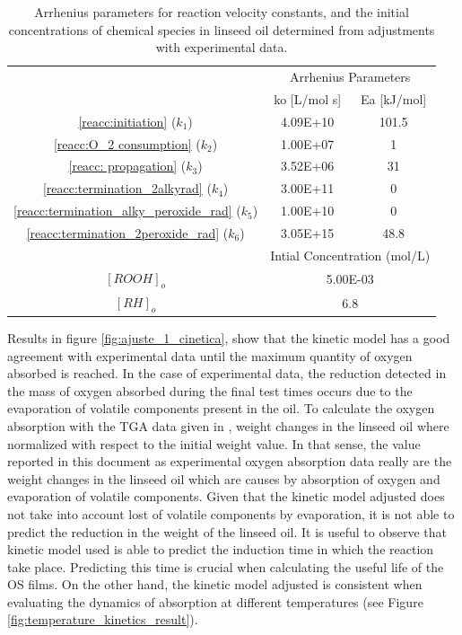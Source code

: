 \begin{table}[H]
\centering
\caption{Arrhenius parameters for reaction velocity constants, and the initial concentrations of chemical species in linseed oil determined from adjustments with experimental data. }
\label{tab:kinetic parameters}

\begin{tabular}{ccc}
\hline
\multirow{2}{*}{} & \multicolumn{2}{c}{Arrhenius   Parameters}  \\
                  & ko {[}L/mol s{]}         & Ea {[}kJ/mol{]}   \\ \hline
\ref{reacc:initiation} ($k_1$)  & 4.09E+10   & 101.5             \\ 
\ref{reacc:O_2 consumption} ($k_2$) & 1.00E+07 & 1               \\ 
\ref{reacc: propagation} ($k_3$) & 3.52E+06  & 31                 \\ 
\ref{reacc:termination_2alkyrad} ($k_4$)  & 3.00E+11 & 0          \\ 
\ref{reacc:termination_alky_peroxide_rad} ($k_5$) & 1.00E+10 & 0   \\
\ref{reacc:termination_2peroxide_rad} ($k_6$)  & 3.05E+15 & 48.8    \\ \hline
                  & \multicolumn{2}{c}{Intial   Concentration (mol/L)} \\
$[ROOH]_o$        & \multicolumn{2}{c}{5.00E-03}                       \\
$[RH]_o$          & \multicolumn{2}{c}{6.8} \\ \hline           
\end{tabular}%
\end{table}

Results in figure \ref{fig:ajuste_1_cinetica}, show that the kinetic model has a good agreement with experimental data until the maximum  quantity of oxygen absorbed is reached. In the case of experimental data, the reduction detected in the mass of oxygen absorbed during the final test times occurs due to the evaporation of volatile components present in the oil. To calculate the oxygen absorption with the TGA data given in \cite{lazzari1999drying}, weight changes in the linseed oil where normalized with respect to the initial weight value. In that sense, the value reported in this document as experimental oxygen absorption data really are the weight changes in the linseed oil which are causes by absorption of oxygen and evaporation of volatile components. Given that the kinetic model adjusted does not take into account lost of volatile components by evaporation, it is not able to predict the reduction in the weight of the linseed oil.  It is useful to observe that kinetic model used  is able to predict the induction time in which the reaction take place. Predicting this time is crucial when calculating the useful life of the OS films. On the other hand, the kinetic model adjusted is consistent when evaluating the dynamics of absorption at different temperatures (see Figure \ref{fig:temperature_kinetics_result}).

